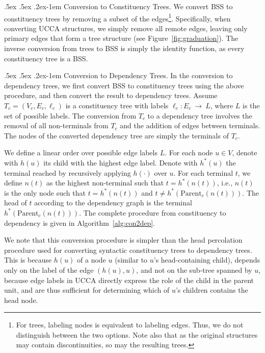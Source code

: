 \documentclass[11pt]{article}
\makeatletter
\newcommand{\figref}[1]{Figure~\ref{#1}}
\renewcommand{\paragraph}{
  \@startsection{paragraph}{4}
  {\z@}{.5ex \@plus .5ex \@minus .2ex}{-1em}
  {\normalfont\normalsize\bfseries}
}
\makeatother
\begin{document}
\paragraph{Conversion to Constituency Trees.}
We convert BSS to constituency trees by removing a subset of the
edges\footnote{For trees, labeling nodes is equivalent to labeling edges. Thus,
  we do not distinguish between the two options. 
  Note also that as the original structures may contain discontinuities, so may the resulting trees.}.
Specifically, when converting UCCA structures, we simply remove all remote edges,
leaving only primary edges that form a tree structure
(see \figref{fig:graduation}).
The inverse conversion from trees to BSS is simply the identity function, as every constituency tree is a BSS.

\paragraph{Conversion to Dependency Trees.}\label{subsec:con2dep}
In the conversion to dependency trees, we first convert BSS
to constituency trees using the above procedure, and then convert the result to dependency trees. 
Assume $T_c=(V_c,E_c,\ell_c)$ is a constituency tree with labels $\ell_c:E_c~\rightarrow~L$,
where $L$ is the set of possible labels.
The conversion from $T_c$ to a dependency tree involves the removal of
all non-terminals from $T_c$ and the addition of edges between terminals.
The nodes of the converted dependency tree are simply the terminals of $T_c$.

We define a linear order over possible edge labels $L$.
For each node $u \in V$, denote with $h(u)$ its child with the highest edge label.
Denote with $h^*(u)$ the terminal reached by recursively applying $h(\cdot)$ over $u$.
For each terminal $t$, we define $n(t)$ as the highest
non-terminal such that $t=h^*(n(t))$, i.e.,
$n(t)$ is the only node such that $t=h^*(n(t))$ and $t \neq h^*(\mathrm{Parent}_c(n(t)))$.
The head of $t$ according to the dependency graph is
the terminal $h^*(\mathrm{Parent}_c(n(t)))$.
The complete procedure from constituency to dependency is given in Algorithm~\ref{alg:con2dep}.

We note that this conversion procedure is simpler than the
head percolation procedure used for converting syntactic constituency
trees to dependency trees.
This is because $h(u)$ of a node $u$ (similar to $u$'s head-containing child),
depends only on the label of the edge $(h(u),u)$, and not on the sub-tree spanned by $u$,
because edge labels in UCCA directly express the role of the child in the parent unit, and
are thus sufficient for determining which of $u$'s children contains the head node.
\end{document}
